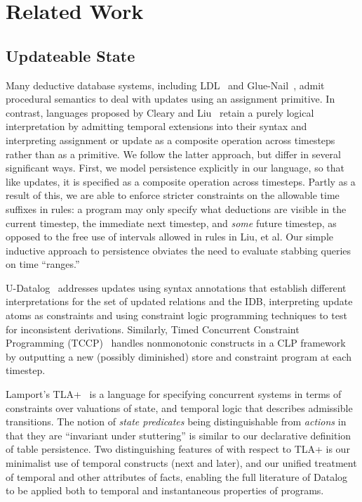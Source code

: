 \section{Related Work}

\subsection{Updateable State}

Many deductive database systems, including LDL~\cite{ldl} and Glue-Nail~\cite{glue-nail}, admit procedural semantics to deal with updates using an
assignment primitive.  In contrast, languages proposed by Cleary and Liu~\cite{harmful,deductiveupdates,starlog} retain a purely logical 
interpretation by admitting temporal extensions into their syntax and interpreting assignment or update as a composite operation
across timesteps~\cite{deductiveupdates} rather than as a primitive.  We follow the latter approach, but differ in several significant ways.
First, we model persistence explicitly in our language, so that like updates, it is specified as a composite operation across timesteps.
Partly as a result of this, we are able to enforce stricter constraints on the allowable time suffixes in rules: a program may only specify what deductions are visible
in the current timestep, the immediate next timestep, and \emph{some} future timestep, as opposed to the free use of intervals allowed in rules in Liu, et al.  Our simple inductive approach to persistence obviates the need to evaluate stabbing queries on time ``ranges.''

U-Datalog~\cite{udatalog-neg} addresses updates using syntax annotations that establish different interpretations for the set of updated 
relations and the IDB, interpreting update atoms as constraints and using constraint logic programming techniques to test for inconsistent
derivations.  Similarly, Timed Concurrent Constraint Programming (TCCP)~\cite{tdccp,tccp} handles nonmonotonic constructs in a CLP framework
by outputting a new (possibly diminished) store and constraint program at each timestep.  

Lamport's TLA+~\cite{tla} is a language for specifying 
concurrent systems in terms of constraints over valuations of state, and temporal logic that describes admissible transitions.  The notion of 
\emph{state predicates} being distinguishable from \emph{actions} in that they are ``invariant under stuttering'' is similar to our declarative definition 
of table persistence.  Two distinguishing features of \lang with respect to TLA+ is our minimalist use of temporal constructs (next and later), and our unified treatment of temporal and other attributes of facts, enabling the full literature of Datalog to be applied both to temporal and instantaneous properties of programs.

